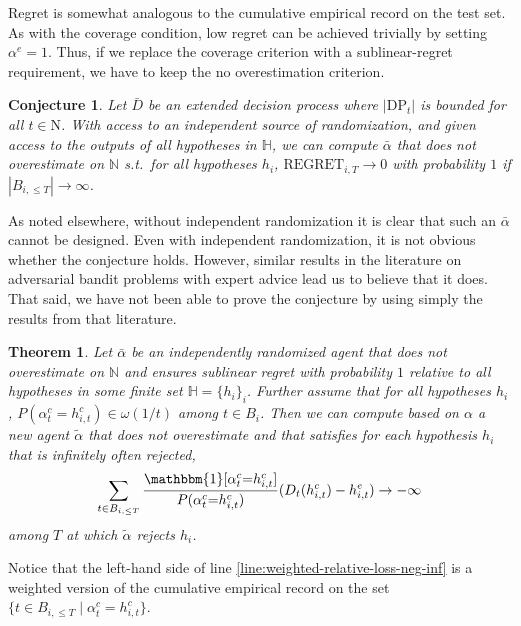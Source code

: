 \documentclass[submission,copyright,creativecommons]{eptcs}
\newtheorem{conjecture}{Conjecture}
\newtheorem{theorem}{Theorem}
\begin{document}
\begin{extendedonlyblock}
Regret is somewhat analogous to the cumulative empirical record on the test set. As with the coverage condition, low regret can be achieved trivially by setting $\alpha^e=1$. Thus, if we replace the coverage criterion with a sublinear-regret requirement, we have to keep the no overestimation criterion.

\begin{conjecture}
Let $\bar D$ be an extended decision process where $|\mathrm{DP}_t|$ is bounded for all $t\in \mathrm{N}$.
With access to an independent source of randomization, and given access to the outputs of all hypotheses in $\mathbb{H}$, we can compute $\bar \alpha$ that does not overestimate on $\mathbb{N}$ s.t.\ for all hypotheses $h_i$, $\mathrm{REGRET}_{i,T}\rightarrow 0 $ with probability $1$ if $|B_{i,\leq T}| \rightarrow \infty$.
\end{conjecture}

As noted elsewhere, without independent randomization it is clear that such an $\bar\alpha$ cannot be designed. Even with independent randomization, it is not obvious whether the conjecture holds. However, similar results in the literature on adversarial bandit problems with expert advice lead us to believe that it does. That said, we have not been able to prove the conjecture by using simply the results from that literature.

\begin{theorem}
Let $\bar\alpha$ be an independently randomized agent that does not overestimate on $\mathbb{N}$ and ensures sublinear regret with probability $1$ relative to all hypotheses in some finite set $\mathbb{H}=\{h_i\}_i$. Further assume that for all hypotheses $h_i$, $P(\alpha_t^c{=}h_{i,t}^c)\in \omega(1/t)$ among $t\in B_i$. Then we can compute based on $\alpha$ a new agent $\tilde \alpha$ that does not overestimate and that satisfies for each hypothesis $h_i$ that is infinitely often rejected,
\begin{equation}\label{line:weighted-relative-loss-neg-inf}
    \sum_{t\in B_{i,\leq T}} \frac{\mathbbm{1}[\alpha_{t}^c{=}h_{i,t}^c]}{P(\alpha_{t}^c{=}h_{i,t}^c)} (D_t(h_{i,t}^c)-h_{i,t}^e) \rightarrow -\infty
\end{equation}
among $T$ at which $\tilde \alpha$ rejects $h_i$.
\end{theorem}

Notice that the left-hand side of line \ref{line:weighted-relative-loss-neg-inf} is a weighted version of the cumulative empirical record on the set $\{ t\in B_{i,\leq T} \mid \alpha_{t}^c{=}h_{i,t}^c \}$.


\end{extendedonlyblock}
\end{document}
